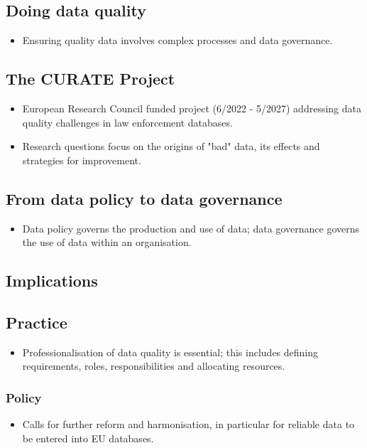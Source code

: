 \documentclass{article}
\begin{document}
\subsection*{Doing data quality}
\begin{itemize}
    \item Ensuring quality data involves complex processes and data governance.
\end{itemize}

\subsection*{The CURATE Project}
\begin{itemize}
    \item European Research Council funded project (6/2022 - 5/2027) addressing data quality challenges in law enforcement databases.
    \item Research questions focus on the origins of "bad" data, its effects and strategies for improvement.
\end{itemize}

\subsection*{From data policy to data governance}
\begin{itemize}
    \item Data policy governs the production and use of data; data governance governs the use of data within an organisation.
\end{itemize}

\subsection*{Implications}
\subsection*{Practice}
\begin{itemize}
    \item Professionalisation of data quality is essential; this includes defining requirements, roles, responsibilities and allocating resources.
\end{itemize}
\subsubsection*{Policy}
\begin{itemize}
    \item Calls for further reform and harmonisation, in particular for reliable data to be entered into EU databases.
\end{itemize}
\end{document}
